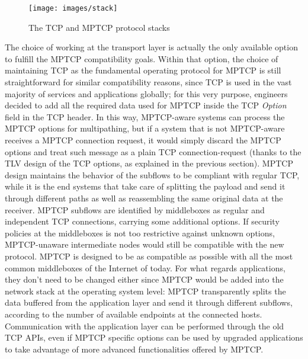 \begin{figure}[!htb]
\centering
\texttt{[image: images/stack]}
\caption{The TCP and MPTCP protocol stacks}
\label{fig:stack}
\end{figure}

The choice of working at the transport layer is actually the only available option to fulfill the MPTCP compatibility goals. Within that option, the choice of maintaining TCP as the fundamental operating protocol for MPTCP is still straightforward for similar compatibility reasons, since TCP is used in the vast majority of services and applications globally; for this very purpose, engineers decided to add all the required data used for MPTCP inside the TCP \textit{Option} field in the TCP header. In this way, MPTCP-aware systems can process the MPTCP options for multipathing, but if a system that is not MPTCP-aware receives a MPTCP connection request, it would simply discard the MPTCP options and treat such message as a plain TCP connection-request (thanks to the TLV design of the TCP options, as explained in the previous section).
MPTCP design maintains the behavior of the subflows to be compliant with regular TCP, while it is the end systems that take care of splitting the payload and send it through different paths as well as reassembling the same original data at the receiver. MPTCP subflows are identified by middleboxes as regular and independent TCP connections, carrying some additional options. If security policies at the middleboxes is not too restrictive against unknown options, MPTCP-unaware intermediate nodes would still be compatible with the new protocol. MPTCP is designed to be as compatible as possible with all the most common middleboxes of the Internet of today.
For what regards applications, they don't need to be changed either since MPTCP would be added into the network stack at the operating system level: MPTCP transparently splits the data buffered from the application layer and send it through different subflows, according to the number of available endpoints at the connected hosts. Communication with the application layer can be performed through the old TCP APIs, even if MPTCP specific options can be used by upgraded applications to take advantage of more advanced functionalities offered by MPTCP.

